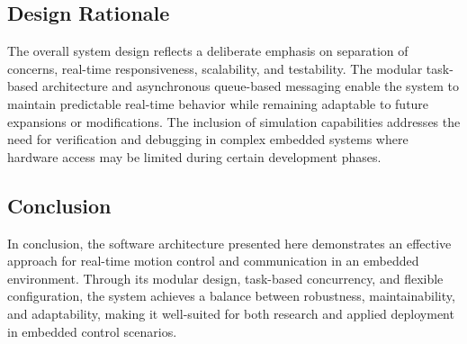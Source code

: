 \subsection{Design Rationale}
The overall system design reflects a deliberate emphasis on separation of concerns, real-time responsiveness, scalability, and testability. The modular task-based architecture and asynchronous queue-based messaging enable the system to maintain predictable real-time behavior while remaining adaptable to future expansions or modifications. The inclusion of simulation capabilities addresses the need for verification and debugging in complex embedded systems where hardware access may be limited during certain development phases.

\subsection{Conclusion}
In conclusion, the software architecture presented here demonstrates an effective approach for real-time motion control and communication in an embedded environment. Through its modular design, task-based concurrency, and flexible configuration, the system achieves a balance between robustness, maintainability, and adaptability, making it well-suited for both research and applied deployment in embedded control scenarios.